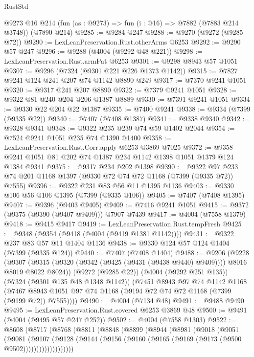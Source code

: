 \begin{lexlean}{RustStd}
\begin{coremodule}
    @9273
    @16
    @214
    (fun (as : @9273) => fun (i : @16) => @7882 (@7883 @214 @3748))
    (@7890 @214)
@9285 := @9284 @247
@9288 := @9270 (@9272 (@9285 @72))
@9290 := LexLeanPreservation.Rust.otherArms @6253
@9292 := @9290 @57 @247
@9296 := @9288 (@4004 (@9292 @48 @221))
@9298 := LexLeanPreservation.Rust.armPat @6253
@9301 := @9298 @8943 @57 @1051
@9307 := @9296 (@7324 (@9301 @221 @226 @1373 @1142))
@9315 := @7827 @9241 @124 @241 @207 @74 @1142 @8890 @249
@9317 := @7370 @9241 @1051
@9320 := @9317 @241 @207 @8890
@9322 := @7379 @9241 @1051
@9328 := @9322 @81 @240 @204 @206 @1387 @8889
@9330 := @7391 @9241 @1051
@9334 := @9330 @22 @204 @22 @1387
@9335 := @7400 @9241
@9338 := @9334 (@7399 (@9335 @22))
@9340 := @7407 (@7408 @1387)
@9341 := @9338 @9340
@9342 := @9328 @9341
@9348 := @9322 @235 @239 @74 @59 @1402 @2044
@9354 := @7524 @9241 @1051 @235 @74 @1390 @1400
@9358 := LexLeanPreservation.Rust.Corr.apply @6253 @3869 @7025
@9372 := @9358 @9241 @1051 @81 @202 @74 @1387 @234 @1142 @1398 @1051 @1379 @124 @1384 @9341
@9375 := @9317 @234 @202 @1398
@9390 := @9322 @97 @233 @74 @201 @1168 @1397 (@9330 @72 @74 @72 @1168 (@7399 (@9335 @72)) @7555)
@9396 := @9322 @231 @83 @56 @11 @1395 @1136
@9403 := @9330 @106 @56 @106 @1395 (@7399 (@9335 @106))
@9405 := @7407 (@7408 @1395)
@9407 := @9396 (@9403 @9405)
@9409 := @7416 @9241 @1051
@9415 := @9372 (@9375 (@9390 (@9407 @9409))) @7907 @7439
@9417 := @4004 (@7558 @1379)
@9418 := @9415 @9417
@9419 := LexLeanPreservation.Rust.tempFresh
@9425 := @9348 (@9354 (@9418 (@4004 (@9419 @1381 @1142))))
@9431 := @9322 @237 @83 @57 @11 @1404 @1136
@9438 := @9330 @124 @57 @124 @1404 (@7399 (@9335 @124))
@9440 := @7407 (@7408 @1404)
@9488 := @9206
    (@9228
      (@9307 (@9315 (@9320 (@9342 (@9425 (@9431 (@9438 @9440) @9409)))) @8016 @8019 @8022 @8024))
      (@9272 (@9285 @22))
      (@4004 (@9292 @251 @135))
      (@7324 (@9301 @135 @48 @1348 @1142))
      (@7451
        @8943
        @97
        @74
        @1142
        @1168
        (@7467 @8943 @1051 @97 @74 @1168 (@9194 @72 @74 @72 @1168 (@7399 (@9199 @72)) @7555))))
@9490 := @4004 (@7134 @48)
@9491 := @9488 @9490
@9495 := LexLeanPreservation.Rust.covered @6253 @3869 @48
@9500 := @9491 (@4004 (@9495 @57 @247 @252))
@9502 := @4004 (@7558 @1303)
@9522 := @8608
    (@8717
      (@8768
        (@8811
          (@8848
            (@8899
              (@8944
                (@8981
                  (@9018
                    (@9051
                      (@9081
                        (@9107
                          (@9128
                            (@9144
                              (@9156 (@9160 (@9165 (@9169 (@9173 (@9500 @9502)))))))))))))))))))

\end{coremodule}
\end{lexlean}
